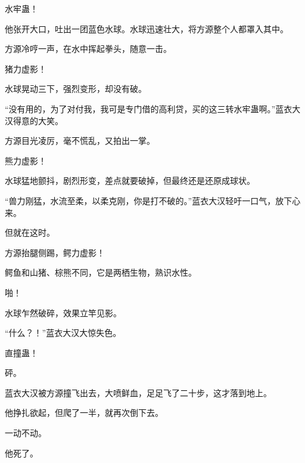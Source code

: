 \begin{this_body}
水牢蛊！

他张开大口，吐出一团蓝色水球。水球迅速壮大，将方源整个人都罩入其中。

方源冷哼一声，在水中挥起拳头，随意一击。

猪力虚影！

水球晃动三下，强烈变形，却没有破。

“没有用的，为了对付我，我可是专门借的高利贷，买的这三转水牢蛊啊。”蓝衣大汉得意的大笑。

方源目光凌厉，毫不慌乱，又拍出一掌。

熊力虚影！

水球猛地颤抖，剧烈形变，差点就要破掉，但最终还是还原成球状。

“兽力刚猛，水流至柔，以柔克刚，你是打不破的。”蓝衣大汉轻吁一口气，放下心来。

但就在这时。

方源抬腿侧踢，鳄力虚影！

鳄鱼和山猪、棕熊不同，它是两栖生物，熟识水性。

啪！

水球乍然破碎，效果立竿见影。

“什么？！”蓝衣大汉大惊失色。

直撞蛊！

砰。

蓝衣大汉被方源撞飞出去，大喷鲜血，足足飞了二十步，这才落到地上。

他挣扎欲起，但爬了一半，就再次倒下去。

一动不动。

他死了。

\end{this_body}

